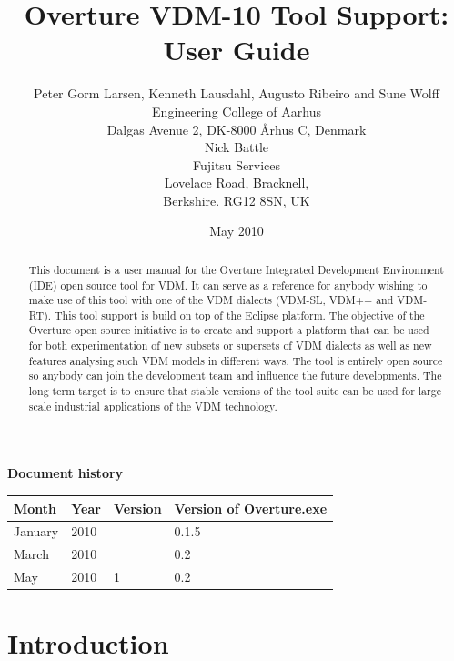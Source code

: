 \documentclass{overturerepchap}
\begin{document}
\title{Overture VDM-10 Tool Support: User Guide}
\author{Peter Gorm Larsen, Kenneth Lausdahl, Augusto Ribeiro and Sune Wolff \\ 
Engineering College of Aarhus\\
Dalgas Avenue 2, DK-8000 \AA{}rhus C, Denmark\\[3mm]
Nick Battle\\
Fujitsu Services\\
Lovelace Road, Bracknell, \\
Berkshire. RG12 8SN, UK}

\date{May 2010}


\maketitle


\textbf{Document history}

\begin{tabular}{|l|l|l|l|}\hline
Month   & Year & Version & Version of Overture.exe \\ \hline
January & 2010 &         & 0.1.5 \\ \hline
March   & 2010 &         & 0.2   \\ \hline
May     & 2010 & 1       & 0.2   \\ \hline
\end{tabular}

\tableofcontents

\begin{abstract}
This document is a user manual for the Overture Integrated Development
Environment (IDE) open source tool for
VDM. It can serve as a reference for anybody wishing to make use of
this tool with one of the VDM dialects (VDM-SL, VDM++ and VDM-RT).
This tool support is build on top of the Eclipse platform. The
objective of the Overture open source initiative is to create and support a
platform that can be used for both experimentation of new subsets or
supersets of VDM dialects as well as new features analysing such VDM
models in different ways. The tool is entirely open source so anybody
can join the development team and influence the future
developments. The long term target is to ensure that stable
versions of the tool suite can be used for large scale industrial
applications of the VDM technology.
\end{abstract}

\chapter{Introduction}
\end{document}
